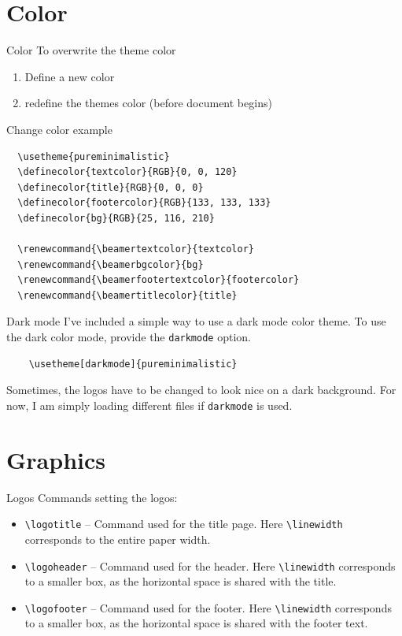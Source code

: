 \documentclass{beamer}
\begin{document}
\section{Color}
\begin{frame}[fragile]{Color}
    To overwrite the theme color
    \begin{enumerate}
        \item Define a new color
        \item redefine the themes color (before document begins)
    \end{enumerate}
\end{frame}

\begin{frame}[fragile]{Change color example}
    \small
    \begin{verbatim}
  \usetheme{pureminimalistic}
  \definecolor{textcolor}{RGB}{0, 0, 120}
  \definecolor{title}{RGB}{0, 0, 0}
  \definecolor{footercolor}{RGB}{133, 133, 133}
  \definecolor{bg}{RGB}{25, 116, 210}

  \renewcommand{\beamertextcolor}{textcolor}
  \renewcommand{\beamerbgcolor}{bg}
  \renewcommand{\beamerfootertextcolor}{footercolor}
  \renewcommand{\beamertitlecolor}{title}
  \end{verbatim}
\end{frame}

\begin{frame}[fragile]{Dark mode}
    I've included a simple way to use a dark mode
    color theme. To use the dark color mode, provide the \texttt{darkmode}
    option.
    \begin{verbatim}
    \usetheme[darkmode]{pureminimalistic}
    \end{verbatim}
    Sometimes, the logos have to be changed to look nice on a
    dark background. For now, I am simply loading different
    files if \texttt{darkmode} is used.
\end{frame}

\section{Graphics}
\begin{frame}{Logos}
    Commands setting the logos:
    \begin{itemize}
        \item \texttt{\textbackslash{}logotitle} -- Command used for the title page.
              Here \texttt{\textbackslash{}linewidth} corresponds to the entire paper width.
        \item \texttt{\textbackslash{}logoheader} -- Command used for the header.
              Here \texttt{\textbackslash{}linewidth} corresponds to a smaller box,
              as the horizontal space is shared with the title.
        \item \texttt{\textbackslash{}logofooter} -- Command used for the footer.
              Here \texttt{\textbackslash{}linewidth} corresponds to a smaller box,
              as the horizontal space is shared with the footer text.
    \end{itemize}
\end{frame}
\end{document}
